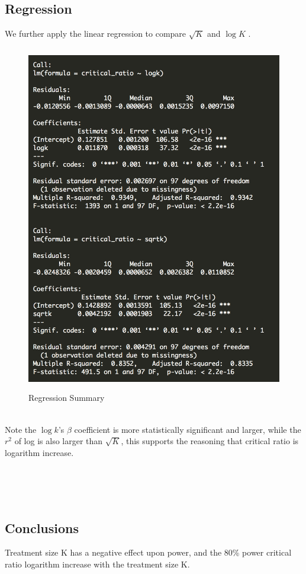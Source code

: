 \documentclass[english]{article}\usepackage{graphicx, color}
\numberwithin{equation}{section}
\numberwithin{figure}{section}
\begin{document}
\subsection{Regression}
We further apply the linear regression to compare $\sqrt{K}$ and $\log{K}$ .
\begin{figure}[htbp]
\centering\includegraphics[width=4.8in,height=6in]{reg}
\caption{Regression Summary}
\end{figure}
\quad\\
Note the $\log{k}$'s $\beta$ coefficient is more statistically significant and larger, while the $r^2$ of log is also larger than $\sqrt{K}$, this supports the reasoning that critical ratio is logarithm increase.

\quad\\
\quad\\
\quad\\



\subsection{Conclusions}
Treatment size K has a negative effect upon power, and the 80\% power critical ratio logarithm increase with the treatment size K.
\end{document}
